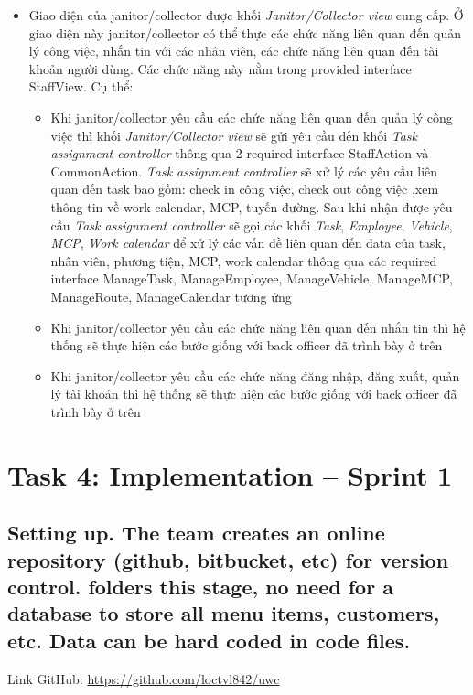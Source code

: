\documentclass[a4paper]{article}
\begin{document}
\begin{itemize}
\begin{itemize}
     \end{itemize}
    \item Giao diện của janitor/collector được khối \textit{Janitor/Collector view} cung cấp. Ở giao diện này janitor/collector có thể thực các chức năng liên quan đến quản lý công việc, nhắn tin với các nhân viên, các chức năng liên quan đến tài khoản người dùng. Các chức năng này nằm trong provided interface StaffView. Cụ thể: 
    \begin{itemize}
         \item Khi janitor/collector yêu cầu các chức năng liên quan đến quản lý công việc thì khối \textit{Janitor/Collector view} sẽ gửi yêu cầu đến khối  \textit{Task assignment controller} thông qua 2 required interface StaffAction và CommonAction. \textit{Task assignment controller} sẽ xử lý các yêu cầu liên quan đến task bao gồm: check in công việc, check out công việc ,xem thông tin về work calendar, MCP, tuyến đường. Sau khi nhận được yêu cầu \textit{Task assignment controller} sẽ gọi các khối \textit{Task}, \textit{Employee}, \textit{Vehicle}, \textit{MCP}, \textit{Work calendar} để xử lý các vấn đề liên quan đến data của task, nhân viên, phương tiện, MCP, work calendar thông qua các required interface ManageTask, ManageEmployee, ManageVehicle, ManageMCP, ManageRoute, ManageCalendar tương ứng
         \item Khi  janitor/collector yêu cầu các chức năng liên quan đến nhắn tin thì hệ thống sẽ thực hiện các bước giống với back officer đã trình  bày ở trên
        \item Khi  janitor/collector yêu cầu các chức năng đăng nhập, đăng xuất, quản lý tài khoản thì hệ thống sẽ thực hiện các bước giống với back officer đã trình  bày ở trên
    \end{itemize}
 \end{itemize}

\section{Task 4: Implementation – Sprint 1}
\subsection{Setting up. The team creates an online repository (github, bitbucket, etc) for version control. folders this stage, no need for a database to store all menu items, customers, etc. Data can be hard coded in code files.}
Link GitHub: \url{https://github.com/loctvl842/uwc}
\end{document}
